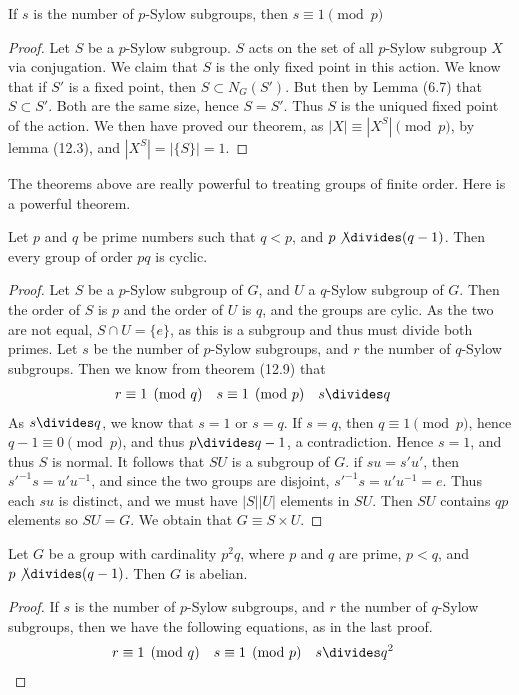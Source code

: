 \begin{theorem}
If $s$ is the number of $p$-Sylow subgroups, then $s \equiv 1 \pmod{p}$
\end{theorem}
\begin{proof}
    Let $S$ be a $p$-Sylow subgroup. $S$ acts on the set of all $p$-Sylow subgroup $X$ via conjugation. We claim that $S$ is the only fixed point in this action. We know that if $S'$ is a fixed point, then $S \subset N_G(S')$. But then by Lemma (6.7) that $S \subset S'$. Both are the same size, hence $S = S'$. Thus $S$ is the uniqued fixed point of the action. We then have proved our theorem, as $|X| \equiv |X^S| \pmod{p}$, by lemma (12.3), and $|X^S| = |\{S\}| = 1$.
\end{proof}

The theorems above are really powerful to treating groups of finite order. Here is a powerful theorem.

\begin{theorem}
    Let $p$ and $q$ be prime numbers such that $q < p$, and $p \not \divides (q-1)$. Then every group of order $pq$ is cyclic.
\end{theorem}
\begin{proof}
    Let $S$ be a $p$-Sylow subgroup of $G$, and $U$ a $q$-Sylow subgroup of $G$. Then the order of $S$ is $p$ and the order of $U$ is $q$, and the groups are cylic. As the two are not equal, $S \cap U = \{ e \}$, as this is a subgroup and thus must divide both primes. Let $s$ be the number of $p$-Sylow subgroups, and $r$ the number of $q$-Sylow subgroups. Then we know from theorem (12.9) that
    \begin{align*} r &\equiv 1 \pmod{q} & s &\equiv 1 \pmod{p} & s &\divides q \end{align*}
    As $s \divides q$, we know that $s = 1$ or $s = q$. If $s = q$, then $q \equiv 1 \pmod{p}$, hence $q-1 \equiv 0 \pmod{p}$, and thus $p \divides q-1$, a contradiction. Hence $s = 1$, and thus $S$ is normal. It follows that $SU$ is a subgroup of $G$. if $su = s'u'$, then $s'^{-1}s = u'u^{-1}$, and since the two groups are disjoint, $s'^{-1}s = u'u^{-1} = e$. Thus each $su$ is distinct, and we must have $|S||U|$ elements in $SU$. Then $SU$ contains $qp$ elements so $SU = G$. We obtain that $G \equiv S \times U$.
\end{proof}

\begin{theorem}
    Let $G$ be a group with cardinality $p^2q$, where $p$ and $q$ are prime, $p < q$, and $p \not \divides (q-1)$. Then $G$ is abelian.
\end{theorem}
\begin{proof}
    If $s$ is the number of $p$-Sylow subgroups, and $r$ the number of $q$-Sylow subgroups, then we have the following equations, as in the last proof.
    \begin{align*} r &\equiv 1 \pmod{q} & s &\equiv 1 \pmod{p} & s &\divides q^2 \end{align*}
\end{proof}

